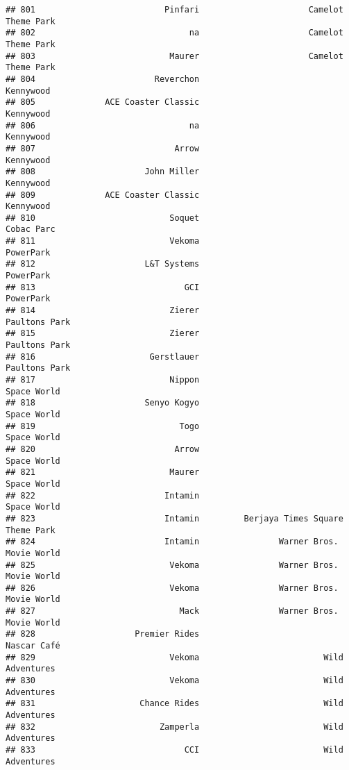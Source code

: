 \documentclass[
]{article}
\begin{document}
\begin{verbatim}
## 801                          Pinfari                      Camelot Theme Park
## 802                               na                      Camelot Theme Park
## 803                           Maurer                      Camelot Theme Park
## 804                        Reverchon                               Kennywood
## 805              ACE Coaster Classic                               Kennywood
## 806                               na                               Kennywood
## 807                            Arrow                               Kennywood
## 808                      John Miller                               Kennywood
## 809              ACE Coaster Classic                               Kennywood
## 810                           Soquet                              Cobac Parc
## 811                           Vekoma                               PowerPark
## 812                      L&T Systems                               PowerPark
## 813                              GCI                               PowerPark
## 814                           Zierer                           Paultons Park
## 815                           Zierer                           Paultons Park
## 816                       Gerstlauer                           Paultons Park
## 817                           Nippon                             Space World
## 818                      Senyo Kogyo                             Space World
## 819                             Togo                             Space World
## 820                            Arrow                             Space World
## 821                           Maurer                             Space World
## 822                          Intamin                             Space World
## 823                          Intamin         Berjaya Times Square Theme Park
## 824                          Intamin                Warner Bros. Movie World
## 825                           Vekoma                Warner Bros. Movie World
## 826                           Vekoma                Warner Bros. Movie World
## 827                             Mack                Warner Bros. Movie World
## 828                    Premier Rides                             Nascar Café
## 829                           Vekoma                         Wild Adventures
## 830                           Vekoma                         Wild Adventures
## 831                     Chance Rides                         Wild Adventures
## 832                         Zamperla                         Wild Adventures
## 833                              CCI                         Wild Adventures

\end{verbatim}
\end{document}
